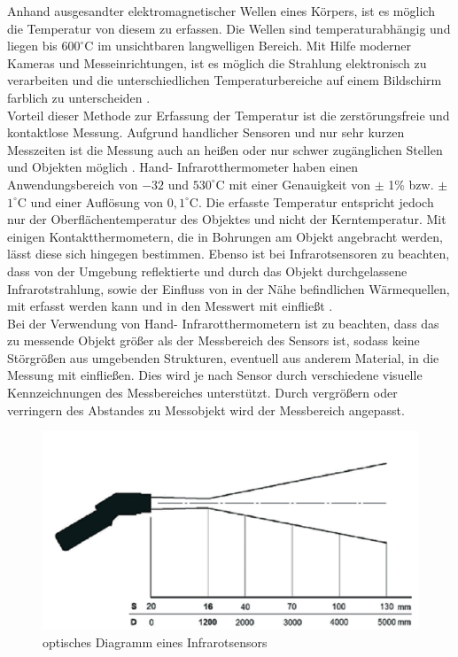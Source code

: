 Anhand ausgesandter elektromagnetischer Wellen eines Körpers, ist es möglich die Temperatur von diesem zu erfassen. Die Wellen sind temperaturabhängig und liegen bis $600^\circ\text{C}$ im unsichtbaren langwelligen Bereich. Mit Hilfe moderner Kameras und Messeinrichtungen, ist es möglich die Strahlung elektronisch zu verarbeiten und die unterschiedlichen Temperaturbereiche auf einem Bildschirm farblich zu unterscheiden \cite{Lindner2006}.\\
Vorteil dieser Methode zur Erfassung der Temperatur ist die zerstörungsfreie und kontaktlose Messung. Aufgrund handlicher Sensoren und nur sehr kurzen Messzeiten ist die Messung auch an heißen oder nur schwer zugänglichen Stellen und Objekten möglich \cite{optris}. Hand- Infrarotthermometer haben einen Anwendungsbereich von $-32$ und $530^\circ\text{C} $ mit einer Genauigkeit von $\pm$ 1\% bzw. $\pm$ $1^\circ\text{C}$ und einer Auflösung von $0,1^\circ\text{C}$. Die erfasste Temperatur entspricht jedoch nur der Oberflächentemperatur des Objektes und nicht der Kerntemperatur. Mit einigen Kontaktthermometern, die in Bohrungen am Objekt angebracht werden, lässt diese sich hingegen bestimmen. Ebenso ist bei Infrarotsensoren zu beachten, dass von der Umgebung reflektierte und durch das Objekt durchgelassene Infrarotstrahlung, sowie der Einfluss von in der Nähe befindlichen Wärmequellen, mit erfasst werden kann und in den Messwert mit einfließt \cite{optris}.\\
Bei der Verwendung von Hand- Infrarotthermometern ist zu beachten, dass das zu messende Objekt größer als der Messbereich des Sensors ist, sodass keine Störgrößen aus umgebenden Strukturen, eventuell aus anderem Material, in die Messung mit einfließen. Dies wird je nach Sensor durch verschiedene visuelle Kennzeichnungen des Messbereiches unterstützt. Durch vergrößern oder verringern des Abstandes zu Messobjekt wird der Messbereich angepasst.
\begin{figure}[h]
	\label{fig:infrarotMessbereich}
	\centering
		\includegraphics[scale=2.0]{bilder/infrarotMessbereich}
	\caption[optisches Diagramm eines Infrarotsensors]{optisches Diagramm eines Infrarotsensors\protect\footnotemark}
\end{figure}

